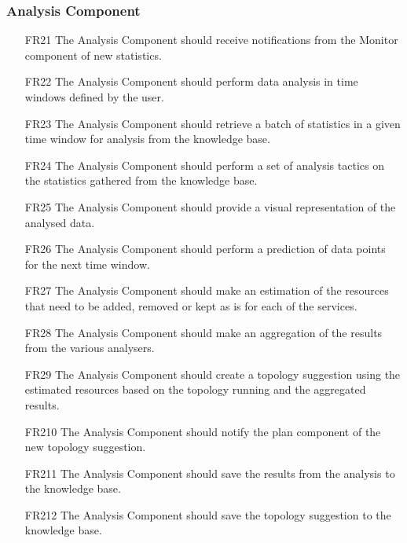 \subsubsection{\textbf{Analysis Component}}
\begin{itemize}
    \item [FR21] The Analysis Component should receive notifications from the Monitor component of new statistics.
    \item [FR22] The Analysis Component should perform data analysis in time windows defined by the user.
    \item [FR23] The Analysis Component should retrieve a batch of statistics in a given time window for analysis from the knowledge base.
    \item [FR24] The Analysis Component should perform a set of analysis tactics on the statistics gathered from the knowledge base.
    \item [FR25] The Analysis Component should provide a visual representation of the analysed data.
    \item [FR26] The Analysis Component should perform a prediction of data points for the next time window.
    \item [FR27] The Analysis Component should make an estimation of the resources that need to be added, removed or kept as is for each of the services.
    \item [FR28] The Analysis Component should make an aggregation of the results from the various analysers.
    \item [FR29] The Analysis Component should create a topology suggestion using the estimated resources based on the topology running and the aggregated results.
    \item [FR210] The Analysis Component should notify the plan component of the new topology suggestion.
    \item [FR211] The Analysis Component should save the results from the analysis to the knowledge base.
    \item [FR212] The Analysis Component should save the topology suggestion to the knowledge base.
\end{itemize}

